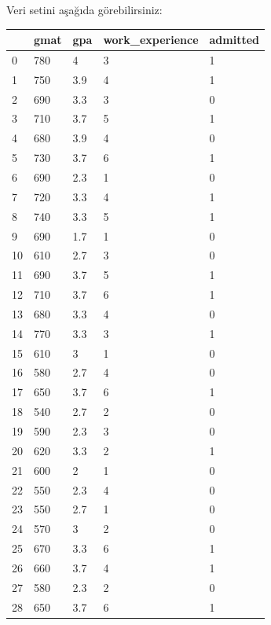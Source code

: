 \documentclass{article}
\begin{document}
Veri setini aşağıda görebilirsiniz:

\begin{table}
    \centering
    \begin{tabular}{|l|l|l|l|l|}
    \hline
         & gmat & gpa & work\_experience & admitted \\ \hline
        0 & 780 & 4 & 3 & 1 \\ \hline
        1 & 750 & 3.9 & 4 & 1 \\ \hline
        2 & 690 & 3.3 & 3 & 0 \\ \hline
        3 & 710 & 3.7 & 5 & 1 \\ \hline
        4 & 680 & 3.9 & 4 & 0 \\ \hline
        5 & 730 & 3.7 & 6 & 1 \\ \hline
        6 & 690 & 2.3 & 1 & 0 \\ \hline
        7 & 720 & 3.3 & 4 & 1 \\ \hline
        8 & 740 & 3.3 & 5 & 1 \\ \hline
        9 & 690 & 1.7 & 1 & 0 \\ \hline
        10 & 610 & 2.7 & 3 & 0 \\ \hline
        11 & 690 & 3.7 & 5 & 1 \\ \hline
        12 & 710 & 3.7 & 6 & 1 \\ \hline
        13 & 680 & 3.3 & 4 & 0 \\ \hline
        14 & 770 & 3.3 & 3 & 1 \\ \hline
        15 & 610 & 3 & 1 & 0 \\ \hline
        16 & 580 & 2.7 & 4 & 0 \\ \hline
        17 & 650 & 3.7 & 6 & 1 \\ \hline
        18 & 540 & 2.7 & 2 & 0 \\ \hline
        19 & 590 & 2.3 & 3 & 0 \\ \hline
        20 & 620 & 3.3 & 2 & 1 \\ \hline
        21 & 600 & 2 & 1 & 0 \\ \hline
        22 & 550 & 2.3 & 4 & 0 \\ \hline
        23 & 550 & 2.7 & 1 & 0 \\ \hline
        24 & 570 & 3 & 2 & 0 \\ \hline
        25 & 670 & 3.3 & 6 & 1 \\ \hline
        26 & 660 & 3.7 & 4 & 1 \\ \hline
        27 & 580 & 2.3 & 2 & 0 \\ \hline
        28 & 650 & 3.7 & 6 & 1 \\ \hline

\end{tabular}
\end{table}
\end{document}
